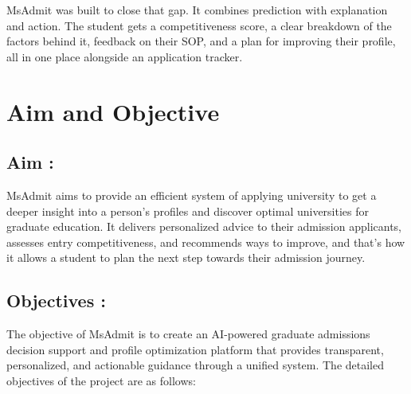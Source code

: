 MsAdmit was built to close that gap. It combines prediction with explanation and action. The student gets a competitiveness score, a clear breakdown of the factors behind it, feedback on their SOP, and a plan for improving their profile, all in one place alongside an application tracker.
\section{Aim and Objective}
\subsection*{Aim :}
\justify
MsAdmit aims to provide an efficient system of applying university to get a deeper insight into a person's profiles and discover optimal universities for graduate education. It delivers personalized advice to their admission applicants, assesses entry competitiveness, and recommends ways to improve, and that's how it allows a student to plan the next step towards their admission journey.

\subsection*{Objectives :}

The objective of MsAdmit is to create an AI-powered graduate
admissions decision support and profile optimization platform
that provides transparent, personalized, and actionable guidance
through a unified system. The detailed objectives of the project
are as follows:

